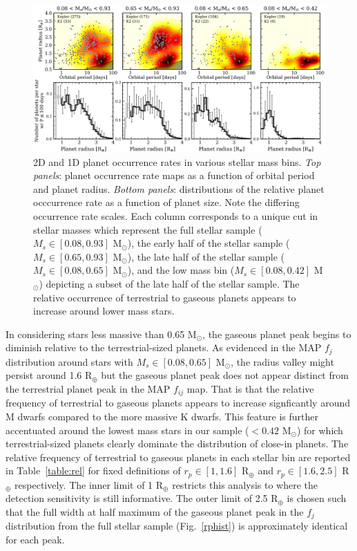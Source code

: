 \documentclass[twocolumn]{emulateapj}
\begin{document}
\begin{figure}
  \centering
  \includegraphics[width=.98\hsize]{figures/rphist_compMs.png}
  \caption{2D and 1D planet occurrence rates in various stellar mass bins. \emph{Top panels}: planet occurrence
    rate maps as a function of orbital period and planet radius. \emph{Bottom panels}: distributions of the relative
    planet occcurrence rate as a function of planet size. Note the differing occurrence rate scales.
    Each column corresponds to a unique cut in stellar masses
    which represent the full stellar sample ($M_s \in [0.08,0.93]$ M$_{\odot}$), the early half of the stellar sample
    ($M_s \in [0.65,0.93]$ M$_{\odot}$), the late half of the stellar sample ($M_s \in [0.08,0.65]$ M$_{\odot}$),
    and the low mass bin ($M_s \in [0.08,0.42]$ M$_{\odot}$) depicting a subset of the late half of the stellar sample.
    The relative occurrence of terrestrial to gaseous planets appears to increase around lower mass stars.}
  \label{fig:rphistcomp}
\end{figure}

In considering stars less massive than 0.65 M$_{\odot}$, the gaseous planet peak begins to diminish relative
to the terrestrial-sized planets. As evidenced in the MAP $f_j$ distribution around stars with
$M_s \in [0.08,0.65]$ M$_{\odot}$, the radius valley might persist around 1.6 R$_{\oplus}$ but the gaseous planet
peak does not appear distinct from the terrestrial planet peak in the MAP $f_{ij}$ map. That is that the relative
frequency of terrestrial to gaseous planets appears to increase signficantly around M dwarfs compared to the more
massive K dwarfs. This feature is further accentuated around the lowest mass stars in our sample ($<0.42$
M$_{\odot}$) for which terrestrial-sized planets clearly dominate the distribution of close-in planets. The relative
frequency of terrestrial to gaseous planets in each stellar bin are reported in Table~\ref{table:rel}
for fixed definitions of $r_p \in [1,1.6]$ R$_{\oplus}$ and $r_p \in [1.6,2.5]$ R$_{\oplus}$ respectively. The inner
limit of 1 R$_{\oplus}$ restricts this analysis to where the detection sensitivity is still informative. The outer
limit of 2.5 R$_{\oplus}$ is chosen such that the full width at half maximum of the gaseous planet peak in the
$f_j$ distribution from the full stellar sample (Fig.~\ref{rphist}) is approximately identical for each peak.
\end{document}
